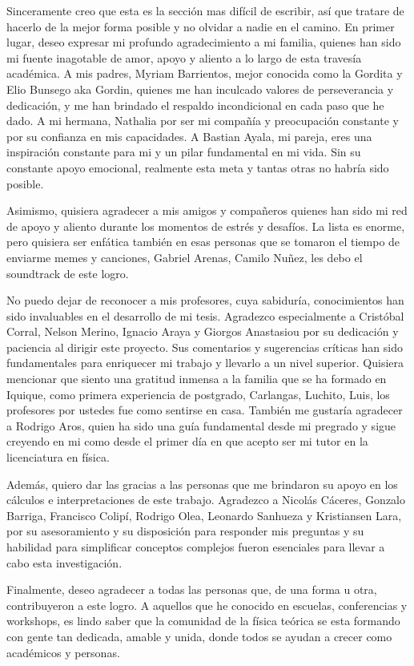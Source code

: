 \documentclass[../Main.tex]{subfiles}
\begin{document}
\vspace*{2\baselineskip}

Sinceramente creo que esta es la sección mas difícil de escribir, así que tratare de hacerlo de la mejor forma posible y no olvidar a nadie en el camino. En primer lugar, deseo expresar mi profundo agradecimiento a mi familia,  quienes han sido mi fuente inagotable de amor, apoyo y aliento a lo largo de esta travesía académica. A mis padres, Myriam Barrientos, mejor conocida como la Gordita y Elio Bunsego aka Gordin, quienes me han inculcado valores de perseverancia y dedicación, y me han brindado el respaldo incondicional en cada paso que he dado. A mi hermana, Nathalia por ser mi compañía y preocupación constante y por su confianza en mis capacidades. A Bastian Ayala, mi pareja, eres una inspiración constante para mi y un pilar fundamental en mi vida. Sin su constante apoyo emocional, realmente esta meta y tantas otras no habría sido posible. 

Asimismo, quisiera agradecer a mis amigos  y compañeros quienes han sido mi red de apoyo y aliento durante los momentos de estrés y desafíos. La lista es enorme, pero quisiera ser enfática también en esas personas que se tomaron el tiempo de enviarme memes y canciones, Gabriel Arenas, Camilo Nuñez, les debo el soundtrack de este logro.  


No puedo dejar de reconocer a mis profesores, cuya sabiduría, conocimientos han sido invaluables en el desarrollo de mi tesis. Agradezco especialmente a Cristóbal Corral, Nelson Merino, Ignacio Araya y Giorgos Anastasiou por su dedicación y paciencia al dirigir este proyecto. Sus comentarios y sugerencias críticas han sido fundamentales para enriquecer mi trabajo y llevarlo a un nivel superior. Quisiera mencionar que siento una gratitud inmensa a la familia que se ha formado en Iquique, como primera experiencia de postgrado, Carlangas, Luchito, Luis, los profesores por ustedes fue como sentirse en casa. También me gustaría agradecer a Rodrigo Aros, quien ha sido una guía fundamental desde mi pregrado y sigue creyendo en mi como desde el primer día en que acepto ser mi tutor en la licenciatura en física. 

Además, quiero dar las gracias a las personas que me brindaron su apoyo en los cálculos e interpretaciones de este trabajo. Agradezco a Nicolás Cáceres, Gonzalo Barriga, Francisco Colipí, Rodrigo Olea, Leonardo Sanhueza y Kristiansen Lara, por su asesoramiento y su disposición para responder mis preguntas y su habilidad para simplificar conceptos complejos fueron esenciales para llevar a cabo esta investigación.

Finalmente, deseo agradecer a todas las personas que, de una forma u otra, contribuyeron a este logro. A aquellos que he conocido en escuelas, conferencias y workshops, es lindo saber que la comunidad de la física teórica se esta formando con gente tan dedicada, amable y unida, donde todos se ayudan a crecer como académicos y personas. 


\vspace*{3\baselineskip}
\end{document}
